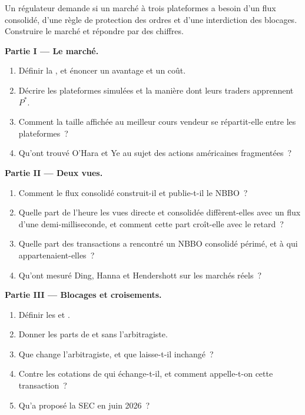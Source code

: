 \begin{problem}\label{pb:mx:fragmentation-and-routing:1}
Un régulateur demande si un marché à trois plateformes a besoin d'un flux consolidé, d'une règle de protection des ordres et d'une interdiction des blocages. Construire le marché et répondre
par des chiffres.

\medskip\noindent\textbf{Partie I --- Le marché.}
\begin{enumerate}
\item Définir la , et énoncer un avantage et un coût.
\item Décrire les plateformes simulées et la manière dont leurs traders apprennent $P^\ast$.
\item Comment la taille affichée au meilleur cours vendeur se répartit-elle entre les plateformes~?
\item Qu'ont trouvé O'Hara et Ye au sujet des actions américaines fragmentées~?
\end{enumerate}

\medskip\noindent\textbf{Partie II --- Deux vues.}
\begin{enumerate}[resume]
\item Comment le flux consolidé construit-il et publie-t-il le NBBO~?
\item Quelle part de l'heure les vues directe et consolidée diffèrent-elles avec un flux d'une demi-milliseconde, et comment cette part croît-elle avec le retard~?
\item Quelle part des transactions a rencontré un NBBO consolidé périmé, et à qui appartenaient-elles~?
\item Qu'ont mesuré Ding, Hanna et Hendershott sur les marchés réels~?
\end{enumerate}

\medskip\noindent\textbf{Partie III --- Blocages et croisements.}
\begin{enumerate}[resume]
\item Définir les  et .
\item Donner les parts de  et  sans l'arbitragiste.
\item Que change l'arbitragiste, et que laisse-t-il inchangé~?
\item Contre les cotations de qui échange-t-il, et comment appelle-t-on cette transaction~?
\item Qu'a proposé la SEC en juin 2026~?
\end{enumerate}


\end{problem}
